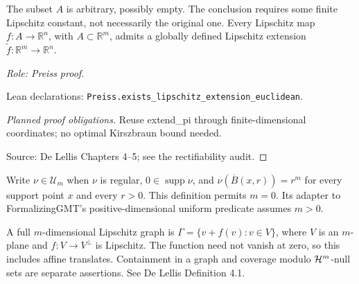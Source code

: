 \begin{lemma}
\label{lem:domain-extension}



The subset \(A\) is arbitrary, possibly empty. The conclusion requires some finite Lipschitz constant, not necessarily the original one.
Every Lipschitz map \(f:A\to\mathbb R^n\), with \(A\subset\mathbb R^m\), admits a globally defined Lipschitz extension \(\widetilde f:\mathbb R^m\to\mathbb R^n\).
\par\emph{Role: Preiss proof.}
\par Lean declarations: \texttt{Preiss.exists\_lipschitz\_extension\_euclidean}.
\end{lemma}
\begin{proof}[Planned proof obligations]
Reuse extend\_pi through finite-dimensional coordinates; no optimal Kirszbraun bound needed.
\par Source: De Lellis Chapters 4--5; see the rectifiability audit.
\end{proof}

\begin{definition}
\label{def:unit-uniform}





Write $\nu\in\mathcal U_m$ when $\nu$ is regular, $0\in\operatorname{supp}\nu$, and $\nu(\overline B(x,r))=r^m$ for every support point $x$ and every $r>0$. This definition permits $m=0$. Its adapter to FormalizingGMT's positive-dimensional uniform predicate assumes $m>0$.
\end{definition}

\begin{definition}
\label{def:lipschitz-graph}










A full $m$-dimensional Lipschitz graph is
$\Gamma=\{v+f(v):v\in V\}$, where $V$ is an $m$-plane and
$f:V\to V^\perp$ is Lipschitz. The function need not vanish at zero, so
this includes affine translates. Containment in a graph and coverage modulo
$\mathcal H^m$-null sets are separate assertions. See De Lellis Definition 4.1.
\end{definition}

